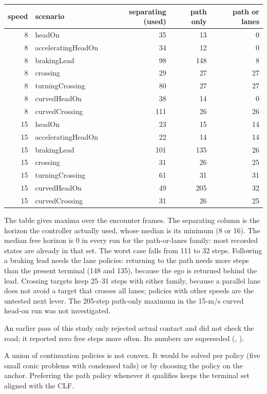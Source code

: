 \documentclass[11pt]{article}
\begin{document}
\begin{center}
\begin{tabular}{rlrrr}
\toprule
speed & scenario & separating (used) & path only & path or lanes\\
\midrule
8 & headOn & 35 & 13 & 0\\
8 & acceleratingHeadOn & 34 & 12 & 0\\
8 & brakingLead & 98 & 148 & 8\\
8 & crossing & 29 & 27 & 27\\
8 & turningCrossing & 80 & 27 & 27\\
8 & curvedHeadOn & 38 & 14 & 0\\
8 & curvedCrossing & 111 & 26 & 26\\
15 & headOn & 23 & 15 & 14\\
15 & acceleratingHeadOn & 22 & 14 & 14\\
15 & brakingLead & 101 & 135 & 26\\
15 & crossing & 31 & 26 & 25\\
15 & turningCrossing & 61 & 31 & 31\\
15 & curvedHeadOn & 49 & 205 & 32\\
15 & curvedCrossing & 31 & 26 & 25\\
\bottomrule
\end{tabular}
\end{center}
The table gives maxima over the encounter frames. The separating column is the
horizon the controller actually used, whose median is its minimum (8 or 16).
The median free horizon is 0 in every run for the path-or-lanes family: most
recorded states are already in that set. The worst case falls from 111 to 32
steps. Following a braking lead needs the lane policies: returning to the path
needs more steps than the present terminal (148 and 135), because the ego is
returned behind the lead. Crossing targets keep 25--31 steps with either
family, because a parallel lane does not avoid a target that crosses all
lanes; policies with other speeds are the untested next lever. The 205-step
path-only maximum in the 15-m/s curved head-on run was not investigated.

An earlier pass of this study only rejected actual contact and did not check
the road; it reported zero free steps more often. Its numbers are superseded
(, ).

A union of continuation policies is not convex. It would be solved per policy
(five small conic problems with condensed tails) or by choosing the policy on
the anchor. Preferring the path policy whenever it qualifies keeps the terminal
set aligned with the CLF.
\end{document}
